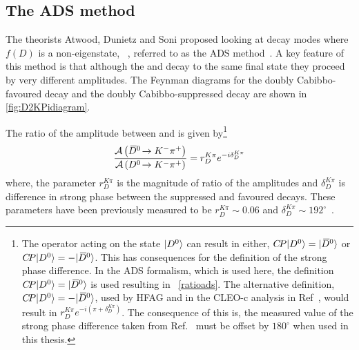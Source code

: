 \subsection{The ADS method}
\label{sec:theory:ads}

The theorists Atwood, Dunietz and Soni proposed looking at \D decay modes where $f(D)$ is a non-\CP eigenstate, \eg~\decay{\D}{\Km\pip}, referred to as the ADS method~\cite{ADS,ADS-2001}. A key feature of this method is that although the \Dz and \Dzb decay to the same final state they proceed by very different amplitudes. The Feynman diagrams for the doubly Cabibbo-favoured \decay{\Dz}{\Km\pip} decay and the doubly Cabibbo-suppressed \decay{\Dz}{\Kp\pim} decay are shown in \fig\ref{fig:D2KPidiagram}.


The ratio of the amplitude between \decay{\Dzb}{\Km\pip} and \decay{\Dz}{\Km\pip} is given by\footnote{The \CP operator acting on the state $|{{D}^0}\rangle$ can result in either, ${C\!P}|{{D}^0}\rangle = |{{\kern 0.2em\overline{\kern -0.2em D}{}}{}^0}\rangle$ or ${C\!P}|{{D}^0}\rangle = - |{{\kern 0.2em\overline{\kern -0.2em D}{}}{}^0}\rangle$. This has consequences for the definition of the strong phase difference. In the ADS formalism, which is used here, the definition ${C\!P}|{{D}^0}\rangle = |{{\kern 0.2em\overline{\kern -0.2em D}{}}{}^0}\rangle$ is used resulting in \eqn~\ref{ratioads}. The alternative definition, ${C\!P}|{{D}^0}\rangle = - |{{\kern 0.2em\overline{\kern -0.2em D}{}}{}^0}\rangle$, used by HFAG and in the CLEO-c analysis in Ref~\cite{charmkpi_deltab}, would result in $r_D^{K\pi}e^{-i(\pi + \delta_D^{K\pi})}$. The consequence of this is, the measured value of the strong phase difference taken from Ref.~\cite{charmkpi_deltab} must be offset by $180^{\circ}$ when used in this thesis.}
\begin{equation}
\frac{\mathcal{A}\left({{\kern 0.2em\overline{\kern -0.2em D}{}}{}^0}\!\rightarrow {\ensuremath{{K}^-}}{\ensuremath{{\pi}^+}}\right)}{\mathcal{A}\left({{D}^0}\!\rightarrow {\ensuremath{{K}^-}}{\ensuremath{{\pi}^+}}\right)} = r_D^{K\pi}e^{-i\delta_D^{K\pi}}
\label{ratioads}
\end{equation}
where, the parameter $r_D^{K\pi}$ is the magnitude of ratio of the amplitudes and $\delta_D^{K\pi}$ is difference in strong phase between the suppressed and favoured decays. These parameters have been previously measured to be $r_D^{K\pi} \sim 0.06$ and $\delta_D^{K\pi} \sim 192^{\circ}$~\cite{HFAG}.

